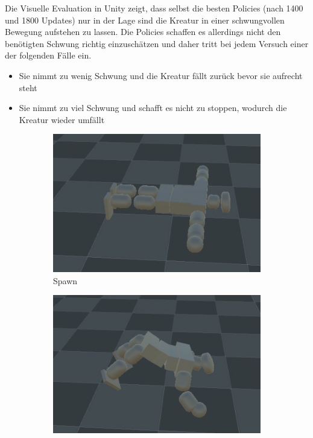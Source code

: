 Die Visuelle Evaluation in Unity zeigt, dass selbst die besten Policies (nach 1400 und 1800 Updates) nur in der Lage sind die Kreatur in einer schwungvollen Bewegung aufstehen zu lassen. Die Policies schaffen es allerdings nicht den benötigten Schwung richtig einzuschätzen und daher tritt bei jedem Versuch einer der folgenden Fälle ein.
\begin{itemize}
	\item Sie nimmt zu wenig Schwung und die Kreatur fällt zurück bevor sie aufrecht steht
	\item Sie nimmt zu viel Schwung und schafft es nicht zu stoppen, wodurch die Kreatur wieder umfällt
\end{itemize}
\begin{figure}
	\centering
	\begin{subfigure}[b]{0.2\textwidth}
		\centering
		\includegraphics[width=\textwidth]{resources/img/2BAufstehen/Fall1_spawn}
		\caption{Spawn}
	\end{subfigure}
	\hfill
	\begin{subfigure}[b]{0.2\textwidth}
		\centering
		\includegraphics[width=\textwidth]{resources/img/2BAufstehen/Fall1_hoch}

\end{subfigure}
\end{figure}
